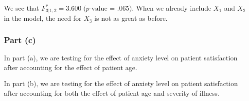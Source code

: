 \documentclass[
]{article}
\begin{document}
We see that \(F_{3|1,2}^* = 3.600 \; \text{($p$-value = $.065$)}\). When
we already include \(X_1\) and \(X_2\) in the model, the need for
\(X_3\) is not as great as before.

\hypertarget{part-c}{%
\subsubsection{Part (c)}\label{part-c}}

In part (a), we are testing for the effect of anxiety level on patient
satisfaction after accounting for the effect of patient age.

In part (b), we are testing for the effect of anxiety level on patient
satisfaction after accounting for both the effect of patient age and
severity of illness.
\end{document}
